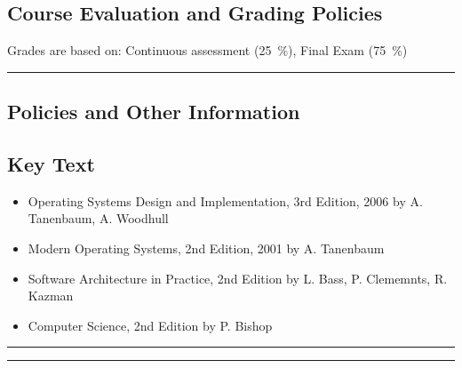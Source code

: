 \subsection*{Course Evaluation and Grading Policies}
Grades are based on:
Continuous assessment (\qty{25}{\percent}),
Final Exam (\qty{75}{\percent})
\vspace{2ex}\hrule\vspace{2ex}



\subsection*{Policies and Other Information}
\subsection*{Key Text}
\begin{itemize}
    \item Operating Systems Design and Implementation, 3rd Edition, 2006 by A. Tanenbaum, A. Woodhull
    \item Modern Operating Systems, 2nd Edition, 2001 by A. Tanenbaum
    \item Software Architecture in Practice, 2nd Edition by L. Bass, P. Clememnts, R. Kazman
    \item Computer Science, 2nd Edition by P. Bishop
\end{itemize}
\vspace{2ex}\hrule
\vspace{2ex}\hrule\vspace{2ex}
